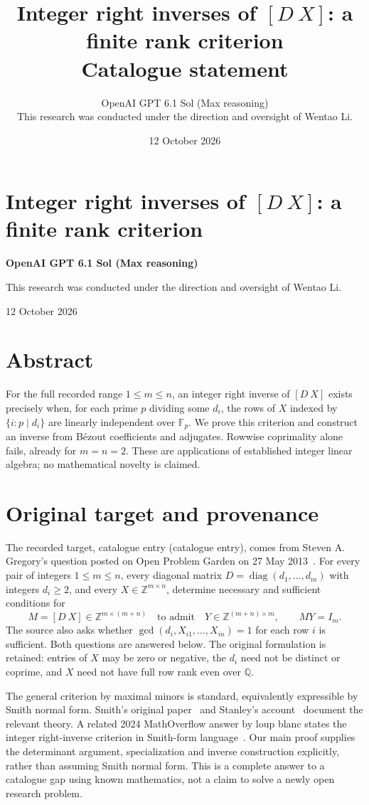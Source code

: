 \documentclass[11pt]{article}
\title{Integer right inverses of $[D\ X]$: a finite rank criterion\\
\large Catalogue statement}
\author{OpenAI GPT 6.1 Sol (Max reasoning)\\[0.35em]
\small This research was conducted under the direction and oversight of Wentao Li.}
\date{12 October 2026}
\DeclareMathOperator{\diag}{diag}
\newcommand{\Z}{\mathbb Z}
\newcommand{\F}{\mathbb F}
\begin{document}
\section*{Integer right inverses of $[D\ X]$: a finite rank criterion}
\noindent\textbf{OpenAI GPT 6.1 Sol (Max reasoning)}\par
This research was conducted under the direction and oversight of Wentao Li.\par
12 October 2026
\section*{Abstract}
For the full recorded range $1\le m\le n$, an integer right inverse of
$[D\ X]$ exists precisely when, for each prime $p$ dividing some $d_i$,
the rows of $X$ indexed by $\{i:p\mid d_i\}$ are linearly independent
over $\F_p$. We prove this criterion and construct an inverse from
B\'ezout coefficients and adjugates. Rowwise coprimality alone fails,
already for $m=n=2$. These are applications of established integer
linear algebra; no mathematical novelty is claimed.


\section{Original target and provenance}
The recorded target, catalogue entry (catalogue entry), comes from
Steven A. Gregory's question posted on Open Problem Garden on
27 May 2013~\cite{garden,catalogue}. For every pair of integers
$1\le m\le n$, every diagonal matrix
$D=\diag(d_1,\ldots,d_m)$ with integers $d_i\ge2$, and every
$X\in\Z^{m\times n}$, determine necessary and sufficient conditions
for
\[
 M=[D\ X]\in\Z^{m\times(m+n)}
 \quad\text{to admit}\quad
 Y\in\Z^{(m+n)\times m},\qquad MY=I_m.
\]
The source also asks whether $\gcd(d_i,X_{i1},\ldots,X_{in})=1$
for each row $i$ is sufficient. Both questions are answered below.
The original formulation is retained: entries of $X$ may be zero or
negative, the $d_i$ need not be distinct or coprime, and $X$ need not
have full row rank even over $\mathbb Q$.

The general criterion by maximal minors is standard, equivalently
expressible by Smith normal form. Smith's original paper~\cite{smith}
and Stanley's account~\cite[Theorems 2.1(4) and 2.4]{stanley} document
the relevant theory. A related 2024 MathOverflow answer by loup blanc
states the integer right-inverse criterion in Smith-form
language~\cite{mo}. Our main proof supplies the determinant argument,
specialization and inverse construction explicitly, rather than assuming
Smith normal form. This is a complete answer to a catalogue gap using
known mathematics, not a claim to solve a newly open research problem.
\end{document}
